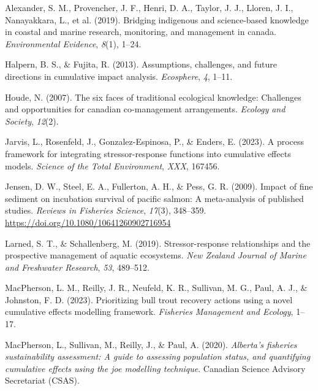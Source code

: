 \documentclass[
  letterpaper,
  DIV=11,
  numbers=noendperiod]{scrreprt}
\newlength{\cslhangindent}
\newlength{\cslentryspacingunit} %
\newenvironment{CSLReferences}[2] %
 {%
  \setlength{\parindent}{0pt}
  \ifodd #1
  \let\oldpar\par
  \def\par{\hangindent=\cslhangindent\oldpar}
  \fi
  \setlength{\parskip}{#2\cslentryspacingunit}
 }%
 {}
\begin{document}
\hypertarget{refs}{}
\begin{CSLReferences}{1}{0}
\leavevmode{}%
Alexander, S. M., Provencher, J. F., Henri, D. A., Taylor, J. J.,
Lloren, J. I., Nanayakkara, L., et al. (2019). Bridging indigenous and
science-based knowledge in coastal and marine research, monitoring, and
management in canada. \emph{Environmental Evidence}, \emph{8}(1), 1--24.

\leavevmode{}%
Halpern, B. S., \& Fujita, R. (2013). Assumptions, challenges, and
future directions in cumulative impact analysis. \emph{Ecosphere},
\emph{4}, 1--11.

\leavevmode{}%
Houde, N. (2007). The six faces of traditional ecological knowledge:
Challenges and opportunities for canadian co-management arrangements.
\emph{Ecology and Society}, \emph{12}(2).

\leavevmode{}%
Jarvis, L., Rosenfeld, J., Gonzalez-Espinosa, P., \& Enders, E. (2023).
A process framework for integrating stressor-response functions into
cumulative effects models. \emph{Science of the Total Environment},
\emph{XXX}, 167456.

\leavevmode{}%
Jensen, D. W., Steel, E. A., Fullerton, A. H., \& Pess, G. R. (2009).
Impact of fine sediment on incubation survival of pacific salmon: A
meta-analysis of published studies. \emph{Reviews in Fisheries Science},
\emph{17}(3), 348--359. \url{https://doi.org/10.1080/10641260902716954}

\leavevmode{}%
Larned, S. T., \& Schallenberg, M. (2019). Stressor-response
relationships and the prospective management of aquatic ecosystems.
\emph{New Zealand Journal of Marine and Freshwater Research}, \emph{53},
489--512.

\leavevmode{}%
MacPherson, L. M., Reilly, J. R., Neufeld, K. R., Sullivan, M. G., Paul,
A. J., \& Johnston, F. D. (2023). Prioritizing bull trout recovery
actions using a novel cumulative effects modelling framework.
\emph{Fisheries Management and Ecology}, 1--17.

\leavevmode{}%
MacPherson, L., Sullivan, M., Reilly, J., \& Paul, A. (2020).
\emph{Alberta's fisheries sustainability assessment: A guide to
assessing population status, and quantifying cumulative effects using
the joe modelling technique}. Canadian Science Advisory Secretariat
(CSAS).


\end{CSLReferences}
\end{document}
